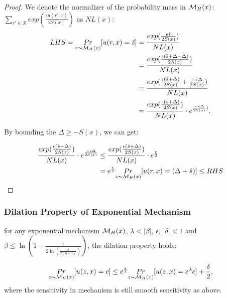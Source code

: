\begin{proof}

We denote the normalizer of the probability mass in $\mathcal{M}_H(x)$: $\sum_{r' \in \mathcal{R}}exp(\frac{\epsilon u(r',x)}{2 S(x)})$ as $NL(x)$:
\begin{equation*}
\begin{split}
LHS 
  = \underset{r \thicksim \mathcal{M}_H(x)}{Pr}[u(r,x) = \hat{s}]
& = \frac{exp(\frac{\epsilon \hat{s}}{2 S(x)})}{NL(x)}\\
& = \frac{exp(\frac{\epsilon (\hat{s} + \Delta - \Delta)}{2 S(x)})}{NL(x)}\\
& = \frac{exp(\frac{\epsilon (\hat{s} + \Delta)}{2 S(x)} + \frac{- \epsilon \Delta}{2 S(x)})}{NL(x)}\\
& = \frac{exp(\frac{\epsilon (\hat{s} + \Delta)}{2 S(x)})}{NL(x)} \cdot e^{\frac{- \epsilon \Delta}{2 S(x)})}.\\
\end{split}
\end{equation*}

By bounding the $\Delta \geq -S(x)$, we can get:

\begin{equation*}
\begin{split}
\frac{exp(\frac{\epsilon (\hat{s} + \Delta)}{2 S(x)})}{NL(x)} \cdot e^{\frac{- \epsilon \Delta}{2 S(x)}}
& \leq \frac{exp(\frac{\epsilon (\hat{s} + \Delta)}{2 S(x)})}{NL(x)} \cdot e^{\frac{\epsilon}{2}}\\
&  =  e^{\frac{\epsilon}{2}} \underset{z \thicksim \mathcal{M}_H(x)}{Pr}[u(r,x) = (\Delta + \hat{s})] \leq RHS\\
\end{split}
\end{equation*}

\end{proof}

\subsubsection{Dilation Property of Exponential Mechanism}
\begin{lem}
for any exponential mechanism $\mathcal{M}_H(x)$, $\lambda < |\beta|$, $\epsilon$, $|\delta| < 1$ and $\beta \leq \ln(1 - \frac{\epsilon}{2 \ln (\frac{\delta}{2 (n + 1)})})$, the dilation property holds:

\begin{equation*}
\underset{z \thicksim \mathcal{M}_H(x)}{Pr}[u(z,x) = c]
\leq
e^{\frac{\epsilon}{2}} \underset{z \thicksim \mathcal{M}_H(x)}{Pr}[u(z,x) = e^{\lambda} c] + \frac{\delta}{2},
\end{equation*}
where the sensitivity in mechanism is still smooth sensitivity as above.
\end{lem}

